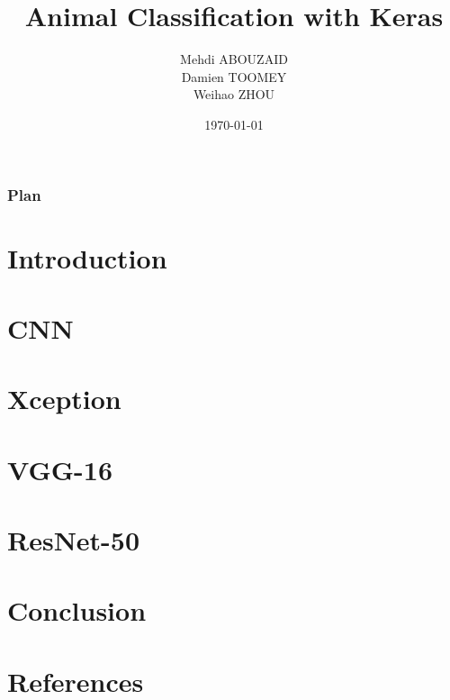 \documentclass{beamer}
\title{Animal Classification with Keras}
\author[MA \--- DT \--- WZ]{Mehdi ABOUZAID  \\ Damien TOOMEY \\ Weihao ZHOU}
\institute[INSA Rouen]{INSA \--- National Institute of Applied Sciences}
\date{\today}
\newif\ifplacelogo %
\begin{document}
\begin{frame}
\titlepage
\end{frame}

\placelogofalse
\begin{frame}
\frametitle{Plan} 
\tableofcontents
\end{frame}	

\section{Introduction}


\section{CNN}


\section{Xception}


\section{VGG-16}


\section{ResNet-50}


\section{Conclusion}


\section{References}

\end{document}
